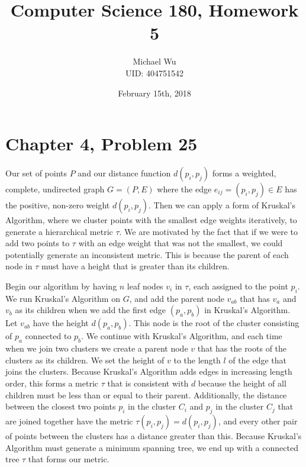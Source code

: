 \documentclass[12pt]{article}
\begin{document}
\title{Computer Science 180, Homework 5}
\date{February 15th, 2018}
\author{Michael Wu\\UID: 404751542}
\maketitle

\section*{Chapter 4, Problem 25}

Our set of points \(P\) and our distance function \(d(p_i,p_j)\) forms a weighted, complete, undirected graph \(G=(P,E)\)
where the edge \(e_{ij}=(p_i,p_j)\in E\) has the positive, non-zero weight \(d(p_i,p_j)\). Then we can apply a form of
Kruskal's Algorithm, where we cluster points with the smallest edge weights iteratively, to generate a hierarchical metric
\(\tau\). We are motivated by the fact that if we were to add two points to \(\tau\) with an edge weight that was not the
smallest, we could potentially generate an inconsistent metric. This is because the parent of each node in \(\tau\) must
have a height that is greater than its children.

Begin our algorithm by having \(n\) leaf nodes \(v_i\) in \(\tau\), each assigned to the point \(p_i\). We run Kruskal's Algorithm on \(G\),
and add the parent node \(v_{ab}\) that has \(v_a\) and \(v_b\) as its children when we add the first edge \((p_a,p_b)\) in Kruskal's
Algorithm. Let \(v_{ab}\) have the height \(d(p_a,p_b)\). This node is the root of the cluster consisting of \(p_a\) connected to \(p_b\).
We continue with Kruskal's Algorithm, and each time when we join two clusters we create a parent node \(v\) that has the roots of the
clusters as its children. We set the height of \(v\) to the length \(l\) of the edge that joins the clusters. Because Kruskal's Algorithm
adds edges in increasing length order, this forms a metric \(\tau\) that is consistent with \(d\) because the height of all children must
be less than or equal to their parent. Additionally, the distance between the closest two points \(p_i\) in the cluster \(C_i\) and \(p_j\)
in the cluster \(C_j\) that are joined together have the metric \(\tau(p_i,p_j)=d(p_i,p_j)\), and every other pair of points between the
clusters has a distance greater than this. Because Kruskal's Algorithm must generate a minimum spanning tree, we end up with a connected
tree \(\tau\) that forms our metric.
\end{document}
